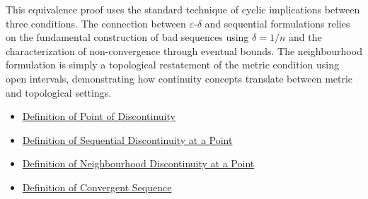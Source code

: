 \begin{remark*}
This equivalence proof uses the standard technique of cyclic implications between three conditions. The connection between $\varepsilon$-$\delta$ and sequential formulations relies on the fundamental construction of bad sequences using $\delta=1/n$ and the characterization of non-convergence through eventual bounds. The neighbourhood formulation is simply a topological restatement of the metric condition using open intervals, demonstrating how continuity concepts translate between metric and topological settings.
\end{remark*}

\begin{dependencies}
\begin{itemize}
  \item \hyperref[def:point-of-discontinuity]{Definition of Point of Discontinuity}
  \item \hyperref[def:sequential-discontinuity-at-a-point]{Definition of Sequential Discontinuity at a Point}
  \item \hyperref[def:neighborhood-discontinuity-at-a-point]{Definition of Neighbourhood Discontinuity at a Point}
  \item \hyperref[def:convergent-sequence]{Definition of Convergent Sequence}
\end{itemize}
\end{dependencies}

\clearpage
